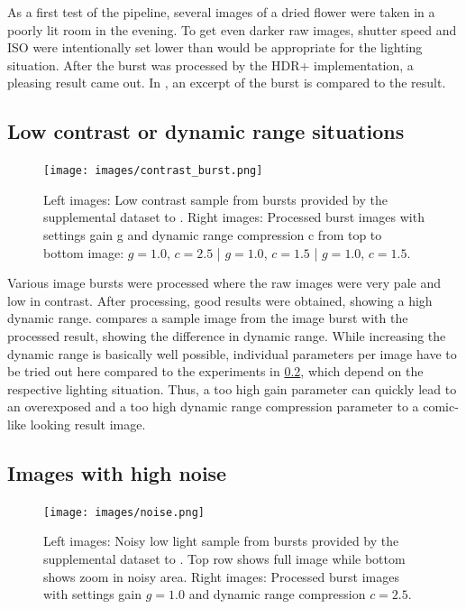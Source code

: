 \documentclass{egpubl}
\begin{document}
As a first test of the pipeline, several images of a dried flower 
were taken in a poorly lit room in the evening. To get even darker 
raw images, shutter speed and ISO were intentionally set lower than 
would be appropriate for the lighting situation. After the burst was
processed by the HDR+ implementation, a pleasing result came out. 
In , an excerpt of the burst is compared to the result.


\subsection{Low contrast or dynamic range situations}
\label{sec:contrast}

\begin{figure}
      \hspace{\fill}
      \texttt{[image: images/contrast\_burst.png]}
      \hspace{\fill}
      \centering
      \caption{
            Left images: Low contrast sample from bursts provided by the supplemental dataset
            to \cite{Hasinoff2016burst}.
            Right images: Processed burst images with settings gain g and dynamic 
            range compression c from top to bottom image: $g=1.0$, $c=2.5$ | $g=1.0$, $c=1.5$ | $g=1.0$, $c=1.5$.
      }
      \label{fig:contrast}
\end{figure}

Various image bursts were processed where the raw images were very pale 
and low in contrast. After processing, good results were obtained, showing 
a high dynamic range.  compares a sample image from the image burst 
with the processed result, showing the difference in dynamic range. While 
increasing the dynamic range is basically well possible, individual parameters 
per image have to be tried out here compared to the experiments in \cref{sec:noise}, 
which depend on the respective lighting situation. Thus, a too high gain 
parameter can quickly lead to an overexposed and a too high dynamic range 
compression parameter to a comic-like looking result image.


\subsection{Images with high noise}
\label{sec:noise}

\begin{figure}
      \hspace{\fill}
      \texttt{[image: images/noise.png]}
      \hspace{\fill}
      \centering
      \caption{
            Left images: Noisy low light sample from bursts provided by the supplemental dataset
            to \cite{Hasinoff2016burst}. Top row shows full image while bottom shows zoom in noisy
            area.
            Right images: Processed burst images with settings gain $g=1.0$ and dynamic 
            range compression $c=2.5$.
      }
      \label{fig:noise}
\end{figure}
\end{document}

